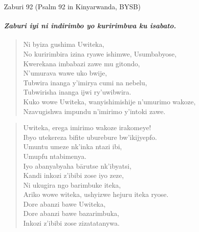 \begin{frame}{Zaburi 92 (Psalm 92 in Kinyarwanda, BYSB)}
    \framesubtitle{\emph{Zaburi iyi ni indirimbo yo kuririmbwa ku isabato.}}
    \begin{verse}
        Ni byiza gushima Uwiteka, \\
        No kuririmbira izina ryawe ishimwe, Usumbabyose, \\
        Kwerekana imbabazi zawe mu gitondo, \\
        N'umurava wawe uko bwije, \\
        Tubwira inanga y'imirya cumi na nebelu, \\
        Tubwirisha inanga ijwi ry'uwibwira. \\
        Kuko wowe Uwiteka, wanyishimishije n'umurimo wakoze, \\
        Nzavugishwa impundu n'imirimo y'intoki zawe.
    \end{verse}
\end{frame}

\begin{frame}
    \begin{verse}
        Uwiteka, erega imirimo wakoze irakomeye! \\
        Ibyo utekereza bifite uburebure bw'ikijyepfo.  \\
        Umuntu umeze nk'inka ntazi ibi, \\
        Umupfu ntabimenya. \\
        Iyo abanyabyaha b{\=a}rutse nk'ibyatsi, \\
        Kandi inkozi z'ibibi zose iyo zeze, \\
        Ni ukugira ngo barimbuke iteka, \\
        Ariko wowe witeka, ushyizwe hejuru iteka ryose. \\
        Dore abanzi bawe Uwiteka, \\
        Dore abanzi bawe bazarimbuka, \\
        Inkozi z'ibibi zose zizatatanywa.
    \end{verse}
\end{frame}

